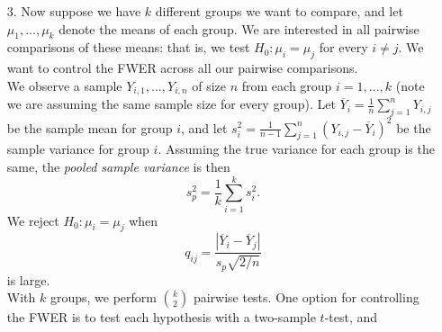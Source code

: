 \documentclass[11pt]{article}
\begin{document}
\begin{enumerate}
\item[3.] Now suppose we have $k$ different groups we want to compare, and let $\mu_1,...,\mu_k$ denote the means of each group. We are interested in all pairwise comparisons of these means: that is, we test $H_0: \mu_i = \mu_j$ for every $i \neq j$. We want to control the FWER across all our pairwise comparisons.\\

We observe a sample $Y_{i,1},...,Y_{i,n}$ of size $n$ from each group $i =1,...,k$ (note we are assuming the same sample size for every group). Let $\overline{Y}_i = \frac{1}{n} \sum \limits_{j=1}^n Y_{i,j}$ be the sample mean for group $i$, and let $s_i^2 = \frac{1}{n-1} \sum \limits_{j=1}^n (Y_{i,j} - \overline{Y}_i)^2$ be the sample variance for group $i$. Assuming the true variance for each group is the same, the \textit{pooled sample variance} is then
$$s_p^2 = \frac{1}{k} \sum \limits_{i=1}^k s_i^2 .$$
We reject $H_0: \mu_i = \mu_j$ when
$$q_{ij} = \dfrac{|\overline{Y}_i - \overline{Y}_j|}{s_p \sqrt{2/n}}$$
is large.\\

With $k$ groups, we perform ${k \choose 2}$ pairwise tests. One option for controlling the FWER is to test each hypothesis with a two-sample $t$-test, and 
\end{enumerate}
\end{document}
